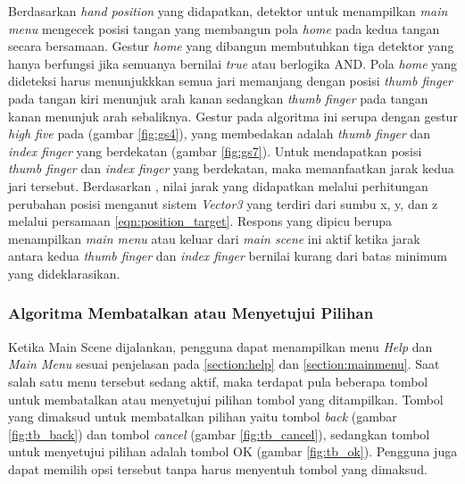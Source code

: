 		 	Berdasarkan \textit{hand position} yang didapatkan, detektor untuk menampilkan \textit{main menu} mengecek posisi tangan yang membangun pola \textit{home} pada kedua tangan secara bersamaan. Gestur \textit{home} yang dibangun membutuhkan tiga detektor yang hanya berfungsi jika semuanya bernilai \textit{true} atau berlogika AND. Pola \textit{home} yang dideteksi harus menunjukkkan semua jari memanjang dengan posisi \textit{thumb finger} pada tangan kiri menunjuk arah kanan sedangkan \textit{thumb finger} pada tangan kanan menunjuk arah sebaliknya. Gestur pada algoritma ini serupa dengan gestur \textit{high five} pada  (gambar \ref{fig:gs4}), yang membedakan adalah \textit{thumb finger} dan \textit{index finger} yang berdekatan (gambar \ref{fig:gs7}). Untuk mendapatkan posisi \textit{thumb finger} dan \textit{index finger} yang berdekatan, maka memanfaatkan jarak kedua jari tersebut. Berdasarkan , nilai jarak yang didapatkan melalui perhitungan perubahan posisi menganut sistem \textit{Vector3} yang terdiri dari sumbu x, y, dan z melalui persamaan \ref{eqn:position_target}. Respons yang dipicu berupa menampilkan \textit{main menu} atau keluar dari \textit{main scene} ini aktif ketika jarak antara kedua \textit{thumb finger} dan \textit{index finger} bernilai kurang dari batas minimum yang dideklarasikan.
		 \vspace{0.75ex}
		 
		 \subsubsection{Algoritma Membatalkan atau Menyetujui Pilihan}
		 \vspace{0.5ex}
		 	Ketika Main Scene dijalankan, pengguna dapat menampilkan menu \textit{Help} dan \textit{Main Menu} sesuai penjelasan pada \ref{section:help} dan \ref{section:mainmenu}. Saat salah satu menu tersebut sedang aktif, maka terdapat pula beberapa tombol untuk membatalkan atau menyetujui pilihan tombol yang ditampilkan. Tombol yang dimaksud untuk membatalkan pilihan yaitu tombol \textit{back} (gambar \ref{fig:tb_back}) dan tombol \textit{cancel} (gambar \ref{fig:tb_cancel}), sedangkan tombol untuk menyetujui pilihan adalah tombol OK (gambar \ref{fig:tb_ok}). Pengguna juga dapat memilih opsi tersebut tanpa harus menyentuh tombol yang dimaksud.
		 	 

